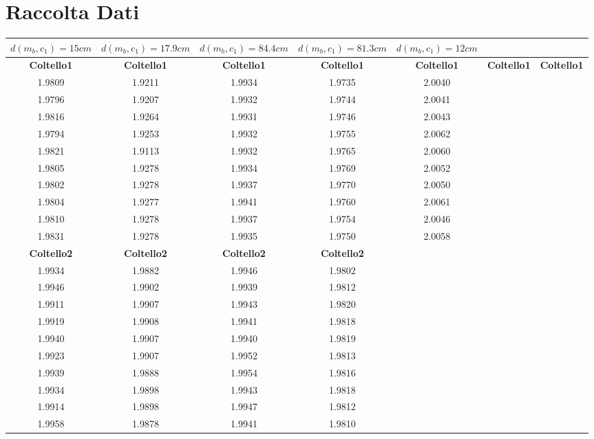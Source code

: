 \documentclass[a4paper,10pt]{report}
\begin{document}
\section{Raccolta Dati}
\begin{tabular}{| c | c | c | c | c | c | c |}

\textbf{$d(m_b,c_1)=15cm$} & \textbf{$d(m_b,c_1)=17.9cm$} & \textbf{$d(m_b,c_1)=84.4cm$}& \textbf{$d(m_b,c_1)=81.3cm$}& \textbf{$d(m_b,c_1)=12cm$}\\
\midrule
 \textbf{Coltello1}&\textbf{Coltello1}&\textbf{Coltello1}&\textbf{Coltello1}&\textbf{Coltello1}&\textbf{Coltello1}&\textbf{Coltello1}\\
 1.9809 & 1.9211 & 1.9934 & 1.9735 & 2.0040\\
 1.9796 & 1.9207 & 1.9932 & 1.9744 & 2.0041\\
 1.9816 & 1.9264 & 1.9931 & 1.9746 & 2.0043\\
 1.9794 & 1.9253 & 1.9932 & 1.9755 & 2.0062\\
 1.9821 & 1.9113 & 1.9932 & 1.9765 & 2.0060\\
 1.9805 & 1.9278 & 1.9934 & 1.9769 & 2.0052\\
 1.9802 & 1.9278 & 1.9937 & 1.9770 & 2.0050\\
 1.9804 & 1.9277 & 1.9941 & 1.9760 & 2.0061\\
 1.9810 & 1.9278 & 1.9937 & 1.9754 & 2.0046\\
 1.9831 & 1.9278 & 1.9935 & 1.9750 & 2.0058\\

 \textbf{Coltello2}&\textbf{Coltello2}&\textbf{Coltello2}&\textbf{Coltello2}\\
 1.9934 & 1.9882 & 1.9946 &	1.9802 & \\
 1.9946 & 1.9902 & 1.9939 &	1.9812\\
 1.9911 & 1.9907 & 1.9943 &	1.9820\\
 1.9919 & 1.9908 & 1.9941 &	1.9818\\
 1.9940 & 1.9907 & 1.9940 &	1.9819\\
 1.9923 & 1.9907 & 1.9952 &	1.9813\\
 1.9939 & 1.9888 & 1.9954 &	1.9816\\
 1.9934 & 1.9898 & 1.9943 &	1.9818\\
 1.9914 & 1.9898 & 1.9947 &	1.9812\\
 1.9958 & 1.9878 & 1.9941 &	1.9810\\
 
 
\end{tabular}
\end{document}
